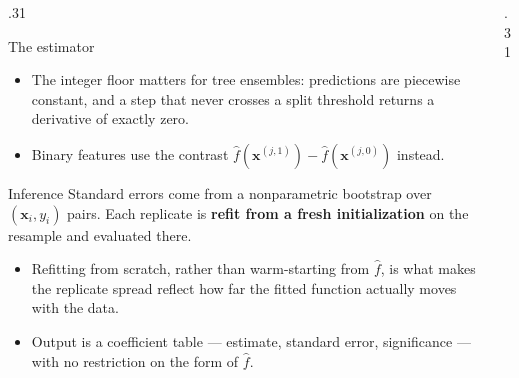 \documentclass[final]{beamer}
\newcommand{\keynum}[1]{{\color{warm}\bfseries #1}}
\begin{document}
\begin{frame}[t]
\begin{columns}[t]
\begin{column}{.31\paperwidth}
\begin{block}{The estimator}
\begin{itemize}
  \item The integer floor matters for tree ensembles: predictions are
        piecewise constant, and a step that never crosses a split threshold
        returns a derivative of exactly zero.
  \item Binary features use the contrast
        $\hat f(\mathbf{x}^{(j,1)}) - \hat f(\mathbf{x}^{(j,0)})$ instead.
\end{itemize}
\end{block}

\begin{block}{Inference}
Standard errors come from a nonparametric bootstrap over
$(\mathbf{x}_i, y_i)$ pairs. Each replicate is \textbf{refit from a fresh
initialization} on the resample and evaluated there.

\begin{itemize}
  \item Refitting from scratch, rather than warm-starting from $\hat f$, is
        what makes the replicate spread reflect how far the fitted function
        actually moves with the data.
  \item Output is a coefficient table --- estimate, standard error,
        significance --- with no restriction on the form of $\hat f$.
\end{itemize}
\end{block}

\end{column}

\begin{column}{.31\paperwidth}



\end{column}
\end{columns}
\end{frame}
\end{document}
